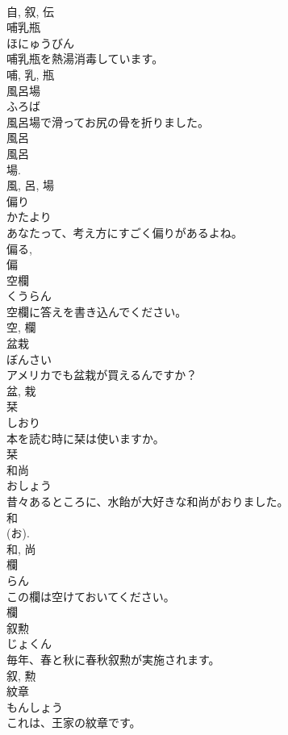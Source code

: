 \documentclass[8pt]{extreport}
\begin{document}
\begin{CJK}{UTF8}{min}
\\	自, 叙, 伝	
\\	哺乳瓶	
\\	ほにゅうびん	
\\	哺乳瓶を熱湯消毒しています。	
\\	哺, 乳, 瓶	
\\	風呂場	
\\	ふろば	
\\	風呂場で滑ってお尻の骨を折りました。	
\\	風呂 
\\	風呂 
\\	場. 
\\	風, 呂, 場	
\\	偏り	
\\	かたより	
\\	あなたって、考え方にすごく偏りがあるよね。	
\\	偏る, 
\\	偏	
\\	空欄	
\\	くうらん	
\\	空欄に答えを書き込んでください。	
\\	空, 欄	
\\	盆栽	
\\	ぼんさい	
\\	アメリカでも盆栽が買えるんですか？	
\\	盆, 栽	
\\	栞	
\\	しおり	
\\	本を読む時に栞は使いますか。	
\\	栞	
\\	和尚	
\\	おしょう	
\\	昔々あるところに、水飴が大好きな和尚がおりました。	
\\	和 
\\	(お). 
\\	和, 尚	
\\	欄	
\\	らん	
\\	この欄は空けておいてください。	
\\	欄	
\\	叙勲	
\\	じょくん	
\\	毎年、春と秋に春秋叙勲が実施されます。	
\\	叙, 勲	
\\	紋章	
\\	もんしょう	
\\	これは、王家の紋章です。	

\end{CJK}
\end{document}
